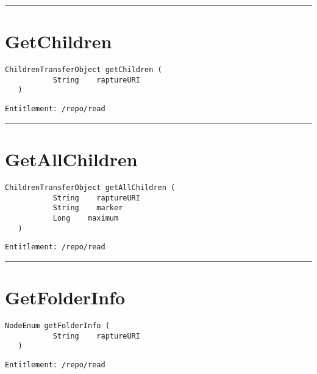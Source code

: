 \rule{12cm}{2pt}
\section{GetChildren}
\label{Api:GetChildren}
\begin{lstlisting}[style=nonumbers]
   ChildrenTransferObject getChildren (
           String    raptureURI
   )
\end{lstlisting}
\begin{Verbatim}[formatcom=\color{Maroon}]
  Entitlement: /repo/read
\end{Verbatim}



\rule{12cm}{2pt}
\section{GetAllChildren}
\label{Api:GetAllChildren}
\begin{lstlisting}[style=nonumbers]
   ChildrenTransferObject getAllChildren (
           String    raptureURI
           String    marker
           Long    maximum
   )
\end{lstlisting}
\begin{Verbatim}[formatcom=\color{Maroon}]
  Entitlement: /repo/read
\end{Verbatim}



\rule{12cm}{2pt}
\section{GetFolderInfo}
\label{Api:GetFolderInfo}
\begin{lstlisting}[style=nonumbers]
   NodeEnum getFolderInfo (
           String    raptureURI
   )
\end{lstlisting}
\begin{Verbatim}[formatcom=\color{Maroon}]
  Entitlement: /repo/read
\end{Verbatim}



